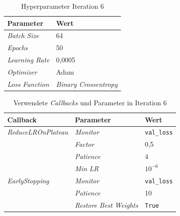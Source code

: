 \documentclass[
    a4paper,        %
    11pt,           %
    ngerman,        %
    parskip=half,   %
    listof=totoc,   %
    bibliography=totoc %
]{scrartcl}
\begin{document}
\begin{table}[H]
    \centering
    \caption{Hyperparameter Iteration 6}
    \label{tab:hyperparams_iter6}
    \begin{tabular}{ll}
        \toprule
        \textbf{Parameter} & \textbf{Wert} \\
        \midrule
        \textit{Batch Size} & 64 \\
        \textit{Epochs} & 50 \\
        \textit{Learning Rate} & 0,0005 \\
        \textit{Optimizer} & Adam \\
        \textit{Loss Function} & \textit{Binary Crossentropy} \\
        \bottomrule
    \end{tabular}
\end{table}

\begin{table}[H]
    \centering
    \caption{Verwendete \textit{Callbacks} und Parameter in Iteration 6}
    \label{tab:callbacks_iter6}
    \begin{tabular}{lll}
        \toprule
        \textbf{Callback} & \textbf{Parameter} & \textbf{Wert} \\
        \midrule
        \textit{ReduceLROnPlateau} & \textit{Monitor} & \texttt{val\_loss} \\
                          & \textit{Factor} & 0,5 \\
                          & \textit{Patience} & 4 \\
                          & \textit{Min LR} & $10^{-6}$ \\
        \midrule
        \textit{EarlyStopping}     & \textit{Monitor} & \texttt{val\_loss} \\
                          & \textit{Patience} & 10 \\
                          & \textit{Restore Best Weights} & \texttt{True} \\
        \bottomrule
    \end{tabular}
\end{table}
\end{document}
